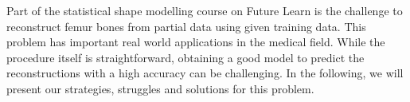 Part of the statistical shape modelling course on Future Learn is the challenge to reconstruct femur bones from partial data using given training data. 
This problem has important real world applications in the medical field. 
While the procedure itself is straightforward, obtaining a good model to predict the reconstructions with a high accuracy can be challenging. 
In the following, we will present our strategies, struggles and solutions for this problem.